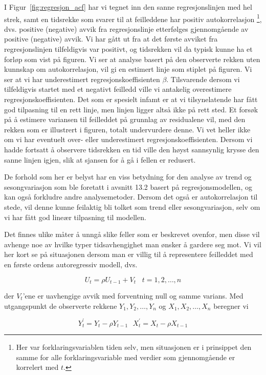 I Figur~\ref{fig:regresjon_acf} har vi tegnet inn den sanne regresjonslinjen med hel strek, samt en
tidsrekke som svarer til at feilleddene har positiv autokorrelasjon
\footnote{Her var forklaringsvariablen tiden selv, men situasjonen er i
prinsippet den samme for alle forklaringsvariable med verdier som
gjennomgående er korrelert med $t$.},
dvs. positive (negative) avvik fra regresjonslinje etterfølges 
gjennomgående av positive (negative) avvik.  Vi har gått ut fra at det
første avviket fra regresjonslinjen tilfeldigvis var positivt, og 
tidsrekken vil da typisk kunne ha et forløp som vist på figuren.  Vi 
ser at analyse basert på den observerte rekken uten kunnskap om
autokorrelasjon, vil gi en estimert linje som stiplet på figuren.
Vi ser at vi har underestimert regresjonskoeffisienten $\beta$.  Tilsvarende
dersom vi tilfeldigvis startet med et negativt feilledd ville vi antakelig
overestimere regresjonskoeffisienten.  Det som er spesielt infamt er at vi
tilsynelatende har fått god tilpasning til en rett linje, men linjen
ligger altså ikke på rett sted.  Et forsøk på å estimere
variansen til feilleddet på grunnlag av residualene vil, med den rekken
som er illustrert i figuren, totalt undervurdere denne.  Vi vet heller ikke om
vi har eventuelt over- eller underestimert regresjonskoeffisienten.  Dersom
vi hadde fortsatt å observere tidsrekken en tid ville den høyst
sannsynlig krysse den sanne linjen igjen, slik at sjansen for å gå
i fellen er redusert.

De forhold som her er belyst har en viss betydning for den analyse av trend
og sesongvariasjon som ble foretatt i avsnitt 13.2 basert på
regresjons\-modellen, og kan også forkludre andre analysemetoder.
Dersom det også er autokorrelasjon til stede, vil denne kunne feilaktig
bli tolket som trend eller sesongvariasjon, selv om vi har 
fått god lineær tilpasning til modellen.

Det finnes ulike måter å unngå slike feller som er beskrevet
ovenfor, men disse vil avhenge noe av hvilke typer tidsavhengighet man
ønsker å gardere seg mot.  Vi vil her kort se på situasjonen
dersom man er villig til å representere feilleddet med en første
ordens autoregressiv modell, dvs.

\[ U_t= \rho U_{t-1} + V_t \; \; \; t=1,2, \ldots , n     \]

\noindent der $V_t$'ene er uavhengige avvik med forventning null og samme
varians. Med utgangspunkt de observerte rekkene $Y_1, Y_2, \ldots, Y_n$ og
$X_1, X_2,\ldots, X_n$ beregner vi

\[ Y_t^{'}=Y_t-\rho Y_{t-1}  \mbox{\ \ \ }  X_t^{'}=X_t-\rho X_{t-1}  \]

